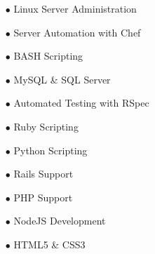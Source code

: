 \documentclass[12pt]{article}
\newenvironment{resblock}[1]
  {\noindent{\large\bf{#1}}}
  {\par\vspace{1em}}
\begin{document}

\setlength\multicolsep{0pt}
\begin{resblock}{Skills}
  \begin{changemargin}{0em}{0em}
  \begin{multicols}{3}\begin{flushleft}\begin{itemize}
    \item[$\bullet$]Linux Server \mbox{Administration}
    \item[$\bullet$]Server \mbox{Automation} with Chef
    \item[$\bullet$]BASH Scripting
    \item[$\bullet$]MySQL \& SQL Server
    \item[$\bullet$]Automated Testing with RSpec
    \item[$\bullet$]Ruby Scripting
    \item[$\bullet$]Python Scripting
    \item[$\bullet$]Rails Support
    \item[$\bullet$]PHP Support
    \item[$\bullet$]NodeJS Development
    \item[$\bullet$]HTML5 \& CSS3
  \end{itemize}\end{flushleft}\end{multicols}
  \end{changemargin}
\end{resblock}
\end{document}
